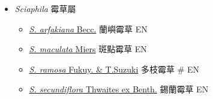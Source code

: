 
  \begin{itemize}
 \item[] \textit{Sciaphila} 霉草屬
                                
  \begin{itemize}
        \item[] \href{http://www.theplantlist.org/tpl1.1/search?q=Sciaphila+arfakiana}{\textit{S. arfakiana} Becc.}   蘭嶼霉草   EN
        \item[] \href{http://www.theplantlist.org/tpl1.1/search?q=Sciaphila+maculata}{\textit{S. maculata} Miers}   斑點霉草   EN
        \item[] \href{http://www.theplantlist.org/tpl1.1/search?q=Sciaphila+ramosa}{\textit{S. ramosa} Fukuy. \& T.Suzuki}   多枝霉草  \# EN
        \item[] \href{http://www.theplantlist.org/tpl1.1/search?q=Sciaphila+secundiflora}{\textit{S. secundiflora} Thwaites ex Benth.}   錫蘭霉草   EN
  \end{itemize}
  \end{itemize}
